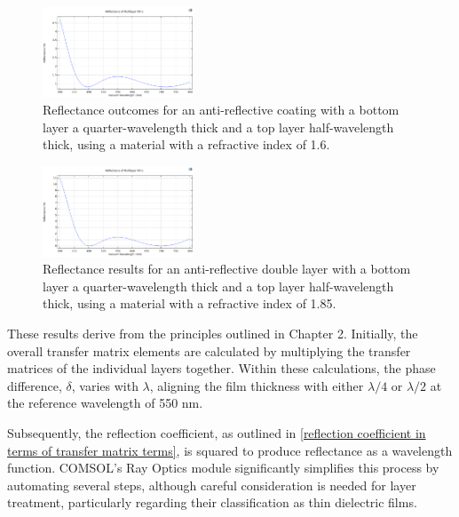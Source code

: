 \begin{figure}[ht!]
  \centering
  \includegraphics[width=0.4\textwidth]{Chapters/Figures/Chapter 4 Figures/Antireflective Figure b.png}
  \caption{Reflectance outcomes for an anti-reflective coating with a bottom layer a quarter-wavelength thick and a top layer half-wavelength thick, using a material with a refractive index of 1.6.}
  \label{fig:Antireflective Figure b}
\end{figure}

\begin{figure}[ht!]
  \centering
  \includegraphics[width=0.4\textwidth]{Chapters/Figures/Chapter 4 Figures/Antireflective Figure c.png}
  \caption{Reflectance results for an anti-reflective double layer with a bottom layer a quarter-wavelength thick and a top layer half-wavelength thick, using a material with a refractive index of 1.85.}
  \label{fig:Antireflective Figure c}
\end{figure}

These results derive from the principles outlined in Chapter 2. Initially, the overall transfer matrix elements are calculated by multiplying the transfer matrices of the individual layers together. Within these calculations, the phase difference, $\delta$, varies with $\lambda$, aligning the film thickness with either $\lambda/4$ or $\lambda/2$ at the reference wavelength of 550 nm.

Subsequently, the reflection coefficient, as outlined in \ref{reflection coefficient in terms of transfer matrix terms}, is squared to produce reflectance as a wavelength function. COMSOL's Ray Optics module significantly simplifies this process by automating several steps, although careful consideration is needed for layer treatment, particularly regarding their classification as thin dielectric films.